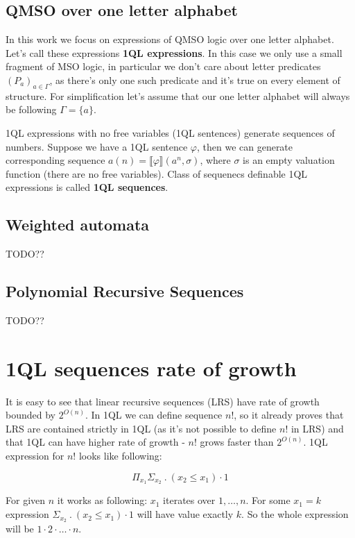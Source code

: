 \documentclass[12pt]{article}
\theoremstyle{definition}
\begin{document}
\subsection{QMSO over one letter alphabet}

In this work we focus on expressions of QMSO logic over one letter alphabet. Let's call these expressions \textbf{1QL expressions}. In this case we only use a small fragment of MSO logic, in particular we don't care about letter predicates $(P_a)_{a \in \Gamma}$, as there's only one such predicate and it's true on every element of structure. For simplification let's assume that our one letter alphabet will always be following $\Gamma = \{a\}$.

1QL expressions with no free variables (1QL sentences) generate sequences of numbers. Suppose we have a 1QL sentence $\varphi$, then we can generate corresponding sequence $a(n) = \llbracket \varphi \rrbracket (a^n, \sigma)$, where $\sigma$ is an empty valuation function (there are no free variables). Class of sequenecs definable 1QL expressions is called \textbf{1QL sequences}.

\subsection{Weighted automata}
TODO??

\subsection{Polynomial Recursive Sequences}
TODO??

\section{1QL sequences rate of growth}
It is easy to see that linear recursive sequences (LRS) have rate of growth bounded by $2^{O(n)}$. In 1QL we can define sequence $n!$, so it already proves that LRS are contained strictly in 1QL (as it's not possible to define $n!$ in LRS) and that 1QL can have higher rate of growth - $n!$ grows faster than $2^{O(n)}$. 1QL expression for $n!$ looks like following:

$$\Pi_{x_1}\Sigma_{x_2} \ . \ (x_2 \leq x_1) \cdot 1$$

For given $n$ it works as following: $x_1$ iterates over $1,\ldots,n$. For some $x_1 = k$ expression $\Sigma_{x_2} \ . \ (x_2 \leq x_1) \cdot 1$ will have value exactly $k$. So the whole expression will be $1 \cdot 2 \cdot \ldots \cdot n$.
\end{document}
